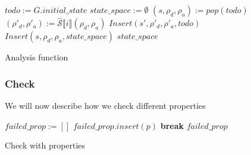 \begin{algorithm}[htb!]
    \begin{codebox}
        \li $todo := G.initial\_state$
        \li $state\_space := \emptyset$
        \li {}
        \li \Do
        $(s,\rho_d,\rho_a):=pop(todo)$
        \li {}
        \li \Do $(\rho'_d,\rho'_a):=\widehat{\mathcal{S}}\llbracket i\rrbracket(\rho_d,\rho_a)$
        \li {}
        \li \Do $Insert(s',\rho'_d,\rho'_a,todo)$
        \EndIf
        \End
        \li $Insert(s,\rho_d,\rho_a,state\_space)$
        \EndFor
        \End
        \EndWhile
        \End
        \li \Return $state\_space$
    \end{codebox}
    \caption{Analysis function}
    \label{alg:analysis}

\end{algorithm}

\subsubsection{Check}\label{subsubsec:check}

We will now describe how we check different properties

\begin{algorithm}[htb!]
    \begin{codebox}
        \li $failed\_prop := []$
        \li {}
        \li \Do {}
        \li \Do {}
        \li \Do $failed\_prop.insert(p)$
        \EndIf
        \End
        \li \textbf{break}
        \EndFor
        \End
        \EndFor
        \End
        \li \Return $failed\_prop$
    \end{codebox}
    \caption{Check with properties}
    \label{alg:check}
\end{algorithm}